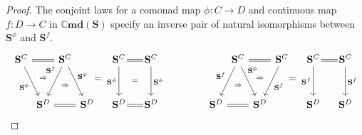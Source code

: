 \documentclass[11pt, oneside, article]{memoir}
\theoremstyle{plain}
\theoremstyle{definition}
\theoremstyle{remark}
\newcommand{\namedcat}[1]{\mathbf{#1}}
\newcommand{\cat}[1]{\mathbf{#1}}
\newcommand{\Cmd}{\mathbb{C}\namedcat{md}}
\newcommand{\CoalgOn}[2]{{#2}^{#1}}
\newcommand{\CoalgS}[1]{\CoalgOn{#1}{\bS}}
\newcommand{\com}[2]{{#1}^{#2}}
\newcommand{\con}[2]{{#1}^{#2}}
\newcommand{\cmnd}[1]{{#1}}
\newcommand{\cC}{\cmnd{C}}
\newcommand{\cD}{\cmnd{D}}
\newcommand{\bS}{\cat{S}}
\newcommand{\CS}{\CoalgS{\cC}}
\newcommand{\DS}{\CoalgS{\cD}}
\begin{document}
\begin{proof}
  The conjoint laws for a comonad map $\phi \colon \cC \to \cD$
  and continuous map $f \colon \cD \to \cC$ in $\Cmd(\bS)$ specify an
  inverse pair of natural isomorphisms between $\com{\bS}{\phi}$ and
  $\con{\bS}{f}$.
  \[
    \begin{tikzcd}[column sep=0, row sep=30]
      \CS && \CS & \\
      & \DS && \DS
      \arrow[""{name=0, anchor=center, inner sep=0}, equals, from=1-1, to=1-3]
      \arrow["{\com{\bS}{\phi}}"', from=1-1, to=2-2]
      \arrow["{\con{\bS}{f}}"', pos=.3, from=1-3, to=2-2]
      \arrow["{\com{\bS}{\phi}}", from=1-3, to=2-4]
      \arrow[""{name=1, anchor=center, inner sep=0}, equals, from=2-4, to=2-2]
      \arrow["\Rightarrow"{description}, draw=none, from=0, to=2-2]
      \arrow["\Rightarrow"{description}, draw=none, from=1-3, to=1]
    \end{tikzcd}
    \!\!\!\!=
    \begin{tikzcd}[column sep=10, row sep=30]
      \CS & \CS \\
      \DS & \DS
      \arrow[shorten=-3pt, equals, from=1-1, to=1-2]
      \arrow[""{name=0, anchor=center, inner sep=0}, "{\com{\bS}{\phi}}"', from=1-1, to=2-1]
      \arrow[""{name=1, anchor=center, inner sep=0}, "{\com{\bS}{\phi}}", from=1-2, to=2-2]
      \arrow[shorten=-3pt, equals, from=2-2, to=2-1]
      \arrow["{=}"{description}, draw=none, from=0, to=1]
    \end{tikzcd}
    \qquad\qquad
    \begin{tikzcd}[column sep=0, row sep=30]
      & \CS && \CS \\
      \DS && \DS
      \arrow[""{name=0, anchor=center, inner sep=0}, equals, from=1-2, to=1-4]
      \arrow["{\con{\bS}{f}}"', from=1-2, to=2-1]
      \arrow["{\com{\bS}{\phi}}", pos=.3, from=1-2, to=2-3]
      \arrow["{\con{\bS}{f}}", from=1-4, to=2-3]
      \arrow[""{name=1, anchor=center, inner sep=0}, equals, from=2-1, to=2-3]
      \arrow["\Rightarrow"{description}, draw=none, from=0, to=2-3]
      \arrow["\Rightarrow"{description}, draw=none, from=1-2, to=1]
    \end{tikzcd}
    \!\!\!\!=
    \begin{tikzcd}[column sep=10, row sep=30]
      \CS & \CS \\
      \DS & \DS
      \arrow[shorten=-3pt, equals, from=1-1, to=1-2]
      \arrow[""{name=0, anchor=center, inner sep=0}, "{\con{\bS}{f}}"', from=1-1, to=2-1]
      \arrow[""{name=1, anchor=center, inner sep=0}, "{\con{\bS}{f}}", from=1-2, to=2-2]

\end{tikzcd}\]
\end{proof}
\end{document}
